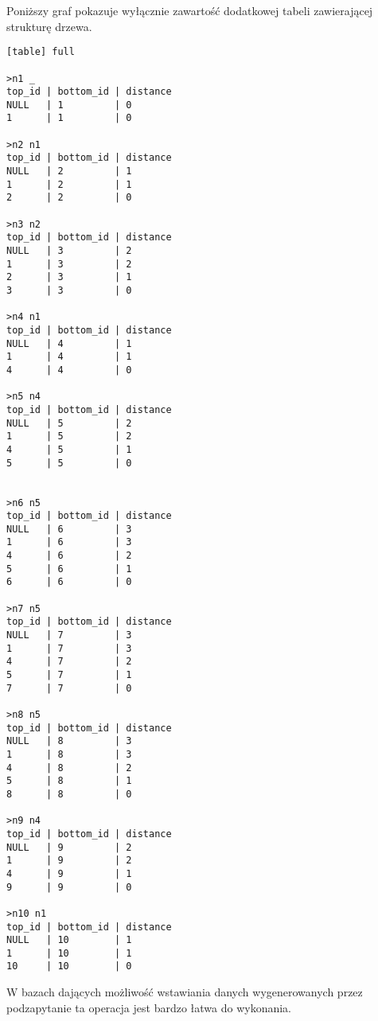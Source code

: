 Poniższy graf pokazuje wyłącznie zawartość dodatkowej tabeli zawierającej strukturę drzewa.


\begin{verbatim}[table] full

>n1 _
top_id | bottom_id | distance
NULL   | 1         | 0
1      | 1         | 0

>n2 n1
top_id | bottom_id | distance
NULL   | 2         | 1
1      | 2         | 1
2      | 2         | 0

>n3 n2
top_id | bottom_id | distance
NULL   | 3         | 2
1      | 3         | 2
2      | 3         | 1
3      | 3         | 0

>n4 n1
top_id | bottom_id | distance
NULL   | 4         | 1
1      | 4         | 1
4      | 4         | 0

>n5 n4
top_id | bottom_id | distance
NULL   | 5         | 2
1      | 5         | 2
4      | 5         | 1
5      | 5         | 0


>n6 n5
top_id | bottom_id | distance
NULL   | 6         | 3
1      | 6         | 3
4      | 6         | 2
5      | 6         | 1
6      | 6         | 0

>n7 n5
top_id | bottom_id | distance
NULL   | 7         | 3
1      | 7         | 3
4      | 7         | 2
5      | 7         | 1
7      | 7         | 0

>n8 n5
top_id | bottom_id | distance
NULL   | 8         | 3
1      | 8         | 3
4      | 8         | 2
5      | 8         | 1
8      | 8         | 0

>n9 n4
top_id | bottom_id | distance
NULL   | 9         | 2
1      | 9         | 2
4      | 9         | 1
9      | 9         | 0

>n10 n1
top_id | bottom_id | distance
NULL   | 10        | 1
1      | 10        | 1
10     | 10        | 0

\end{verbatim}






W bazach dających możliwość wstawiania danych wygenerowanych przez podzapytanie ta operacja jest bardzo łatwa do wykonania.




